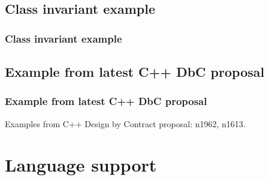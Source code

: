 \documentclass{beamer}
\begin{document}
\subsection{Class invariant example}
\begin{frame}[fragile]
\frametitle{Class invariant example}

\end{frame}

\subsection{Example from latest C++ DbC proposal}
\begin{frame}
\frametitle{Example from latest C++ DbC proposal}

\pause
\begin{block}{}
Examples from C++ Design by Contract proposal: n1962, n1613.
\end{block}
\end{frame}



\section{Language support}
\begin{frame}
\sectionpage
\end{frame}
\end{document}
